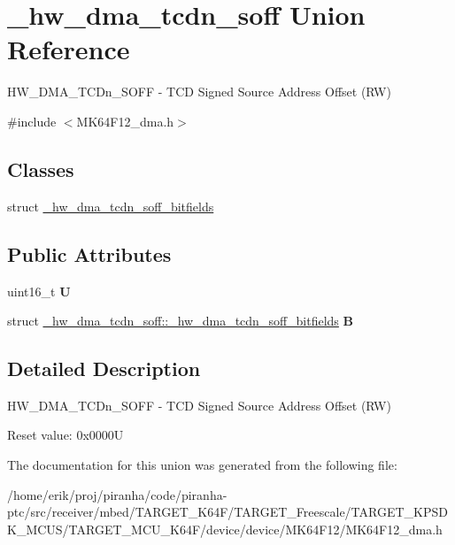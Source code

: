 \hypertarget{union__hw__dma__tcdn__soff}{}\section{\+\_\+hw\+\_\+dma\+\_\+tcdn\+\_\+soff Union Reference}
\label{union__hw__dma__tcdn__soff}


H\+W\+\_\+\+D\+M\+A\+\_\+\+T\+C\+Dn\+\_\+\+S\+O\+FF -\/ T\+CD Signed Source Address Offset (RW)  




{\ttfamily \#include $<$M\+K64\+F12\+\_\+dma.\+h$>$}

\subsection*{Classes}
\begin{DoxyCompactItemize}
\item 
struct \hyperlink{struct__hw__dma__tcdn__soff_1_1__hw__dma__tcdn__soff__bitfields}{\+\_\+hw\+\_\+dma\+\_\+tcdn\+\_\+soff\+\_\+bitfields}
\end{DoxyCompactItemize}
\subsection*{Public Attributes}
\begin{DoxyCompactItemize}
\item 
uint16\+\_\+t {\bfseries U}\hypertarget{union__hw__dma__tcdn__soff_aef5d4ff0fcddb26a8e9d2d2101311d14}{}\label{union__hw__dma__tcdn__soff_aef5d4ff0fcddb26a8e9d2d2101311d14}

\item 
struct \hyperlink{struct__hw__dma__tcdn__soff_1_1__hw__dma__tcdn__soff__bitfields}{\+\_\+hw\+\_\+dma\+\_\+tcdn\+\_\+soff\+::\+\_\+hw\+\_\+dma\+\_\+tcdn\+\_\+soff\+\_\+bitfields} {\bfseries B}\hypertarget{union__hw__dma__tcdn__soff_a1c509551f3eca9a582ef8af4c6122e4d}{}\label{union__hw__dma__tcdn__soff_a1c509551f3eca9a582ef8af4c6122e4d}

\end{DoxyCompactItemize}


\subsection{Detailed Description}
H\+W\+\_\+\+D\+M\+A\+\_\+\+T\+C\+Dn\+\_\+\+S\+O\+FF -\/ T\+CD Signed Source Address Offset (RW) 

Reset value\+: 0x0000U 

The documentation for this union was generated from the following file\+:\begin{DoxyCompactItemize}
\item 
/home/erik/proj/piranha/code/piranha-\/ptc/src/receiver/mbed/\+T\+A\+R\+G\+E\+T\+\_\+\+K64\+F/\+T\+A\+R\+G\+E\+T\+\_\+\+Freescale/\+T\+A\+R\+G\+E\+T\+\_\+\+K\+P\+S\+D\+K\+\_\+\+M\+C\+U\+S/\+T\+A\+R\+G\+E\+T\+\_\+\+M\+C\+U\+\_\+\+K64\+F/device/device/\+M\+K64\+F12/M\+K64\+F12\+\_\+dma.\+h\end{DoxyCompactItemize}
